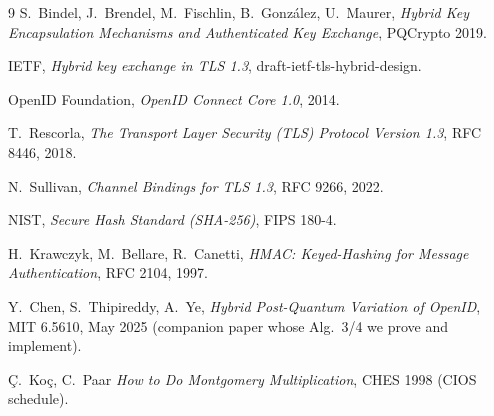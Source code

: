 \begin{thebibliography}{9}
S.~Bindel, J.~Brendel, M.~Fischlin, B.~González, U.~Maurer,
\emph{Hybrid Key Encapsulation Mechanisms and Authenticated Key Exchange},
PQCrypto 2019.

IETF, \emph{Hybrid key exchange in TLS 1.3},
draft-ietf-tls-hybrid-design.

OpenID Foundation, \emph{OpenID Connect Core 1.0}, 2014.

T.~Rescorla, \emph{The Transport Layer Security (TLS) Protocol Version 1.3},
RFC 8446, 2018.

N.~Sullivan, \emph{Channel Bindings for TLS 1.3}, RFC 9266, 2022.

NIST, \emph{Secure Hash Standard (SHA-256)}, FIPS 180-4.

H.~Krawczyk, M.~Bellare, R.~Canetti, \emph{HMAC: Keyed-Hashing for Message
Authentication}, RFC 2104, 1997.

Y.~Chen, S.~Thipireddy, A.~Ye, \emph{Hybrid Post-Quantum Variation of
OpenID}, MIT 6.5610, May 2025 (companion paper whose Alg.\ 3/4 we prove and
implement).

{\c{C}}.~Ko{\c{c}}, C.~Paar \emph{How to Do Montgomery Multiplication},
CHES 1998 (CIOS schedule).
\end{thebibliography}


